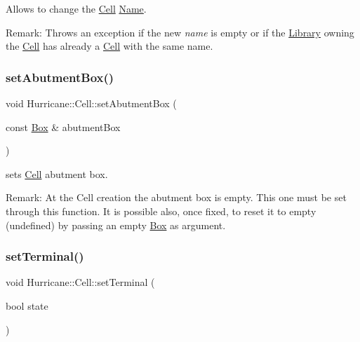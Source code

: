 Allows to change the \mbox{\hyperlink{classHurricane_1_1Cell}{Cell}} \mbox{\hyperlink{classHurricane_1_1Name}{Name}}.

\begin{DoxyParagraph}{Remark\+: Throws an exception if the new {\itshape name} is empty or if the}
\mbox{\hyperlink{classHurricane_1_1Library}{Library}} owning the \mbox{\hyperlink{classHurricane_1_1Cell}{Cell}} has already a \mbox{\hyperlink{classHurricane_1_1Cell}{Cell}} with the same name. 
\end{DoxyParagraph}
\mbox{\label{classHurricane_1_1Cell_ab1949e2b708f0bd2d215ab90cfe864e0}} 
\subsubsection{\texorpdfstring{set\+Abutment\+Box()}{setAbutmentBox()}}
{\footnotesize\ttfamily void Hurricane\+::\+Cell\+::set\+Abutment\+Box (\begin{DoxyParamCaption}\item[{const \mbox{\hyperlink{classHurricane_1_1Box}{Box}} \&}]{abutment\+Box }\end{DoxyParamCaption})}

sets \mbox{\hyperlink{classHurricane_1_1Cell}{Cell}} abutment box.

\begin{DoxyParagraph}{Remark\+: At the Cell creation the abutment box is empty. This one must}
be set through this function. It is possible also, once fixed, to reset it to empty (undefined) by passing an empty \mbox{\hyperlink{classHurricane_1_1Box}{Box}} as argument. 
\end{DoxyParagraph}
\mbox{\label{classHurricane_1_1Cell_a4591dc37153a835daa42b442221742cb}} 
\subsubsection{\texorpdfstring{set\+Terminal()}{setTerminal()}}
{\footnotesize\ttfamily void Hurricane\+::\+Cell\+::set\+Terminal (\begin{DoxyParamCaption}\item[{bool}]{state }\end{DoxyParamCaption})\hspace{0.3cm}{\ttfamily [inline]}}

